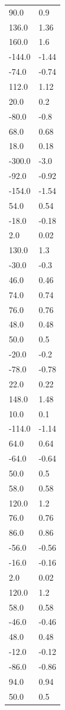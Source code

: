 \begin{longtable}{ll}
90.0 & 0.9 \\
136.0 & 1.36 \\
160.0 & 1.6 \\
-144.0 & -1.44 \\
-74.0 & -0.74 \\
112.0 & 1.12 \\
20.0 & 0.2 \\
-80.0 & -0.8 \\
68.0 & 0.68 \\
18.0 & 0.18 \\
-300.0 & -3.0 \\
-92.0 & -0.92 \\
-154.0 & -1.54 \\
54.0 & 0.54 \\
-18.0 & -0.18 \\
2.0 & 0.02 \\
130.0 & 1.3 \\
-30.0 & -0.3 \\
46.0 & 0.46 \\
74.0 & 0.74 \\
76.0 & 0.76 \\
48.0 & 0.48 \\
50.0 & 0.5 \\
-20.0 & -0.2 \\
-78.0 & -0.78 \\
22.0 & 0.22 \\
148.0 & 1.48 \\
10.0 & 0.1 \\
-114.0 & -1.14 \\
64.0 & 0.64 \\
-64.0 & -0.64 \\
50.0 & 0.5 \\
58.0 & 0.58 \\
120.0 & 1.2 \\
76.0 & 0.76 \\
86.0 & 0.86 \\
-56.0 & -0.56 \\
-16.0 & -0.16 \\
2.0 & 0.02 \\
120.0 & 1.2 \\
58.0 & 0.58 \\
-46.0 & -0.46 \\
48.0 & 0.48 \\
-12.0 & -0.12 \\
-86.0 & -0.86 \\
94.0 & 0.94 \\
50.0 & 0.5 \\

\end{longtable}
